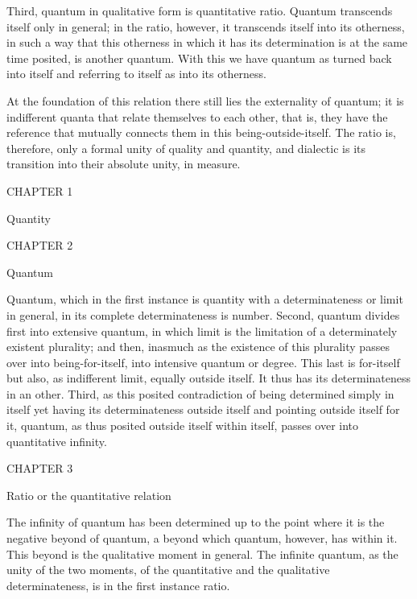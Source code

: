 Third, quantum in qualitative form is quantitative ratio.
Quantum transcends itself only in general;
in the ratio, however, it transcends itself into its otherness,
in such a way that this otherness in which it has its determination
is at the same time posited, is another quantum.
With this we have quantum as turned back into itself
and referring to itself as into its otherness.

At the foundation of this relation there still
lies the externality of quantum;
it is indifferent quanta that
relate themselves to each other,
that is, they have the reference
that mutually connects them
in this being-outside-itself.
The ratio is, therefore, only
a formal unity of quality and quantity,
and dialectic is its transition into
their absolute unity, in measure.

CHAPTER 1

Quantity

CHAPTER 2

Quantum

Quantum, which in the first instance is quantity
with a determinateness or limit in general,
in its complete determinateness is number.
Second, quantum divides first into extensive quantum,
in which limit is the limitation of
a determinately existent plurality;
and then, inasmuch as the existence of
this plurality passes over into being-for-itself,
into intensive quantum or degree.
This last is for-itself but also,
as indifferent limit, equally outside itself.
It thus has its determinateness in an other.
Third, as this posited contradiction of
being determined simply in itself
yet having its determinateness outside itself
and pointing outside itself for it,
quantum, as thus posited outside itself within itself,
passes over into quantitative infinity.

CHAPTER 3

Ratio or the quantitative relation

The infinity of quantum has been determined up to
the point where it is the negative beyond of quantum,
a beyond which quantum, however, has within it.
This beyond is the qualitative moment in general.
The infinite quantum, as the unity of the two moments,
of the quantitative and the qualitative determinateness,
is in the first instance ratio.

